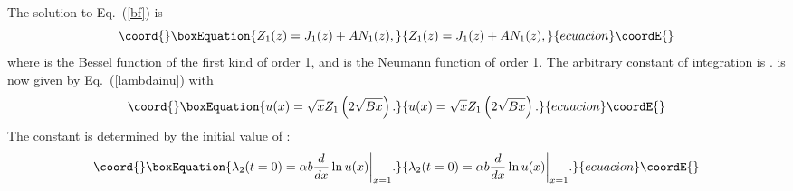 \documentclass[a4paper,aps,prl,preprint,groupedaddress,showpacs,nobibnotes,tightenlines]{revtex4}
\begin{document}
The solution to Eq.~(\ref{bf}) is
\begin{equation}\coord{}\boxEquation{
Z_1(z)=J_1(z)+AN_1(z),
}{
Z_1(z)=J_1(z)+AN_1(z),
}{ecuacion}\coordE{}\end{equation}
where \coordHE{} is the Bessel function of the first kind of order 1, and \coordHE{}
is the Neumann function of order 1.  The arbitrary constant of integration
is \coordHE{}.  \coordHE{} is now given by Eq.~(\ref{lambdainu}) with
\begin{equation}\coord{}\boxEquation{
u(x)=\sqrt{x}Z_1\left(2\sqrt{Bx}\right).
}{
u(x)=\sqrt{x}Z_1\left(2\sqrt{Bx}\right).
}{ecuacion}\coordE{}\end{equation}
The constant \coordHE{} is determined by the initial value of \coordHE{}:
\begin{equation}\coord{}\boxEquation{
\lambda_2(t=0)=\alpha b{d\over dx}\ln u(x)\bigg|_{x=1}.
}{
\lambda_2(t=0)=\alpha b{d\over dx}\ln u(x)\bigg|_{x=1}.
}{ecuacion}\coordE{}\end{equation}
\end{document}
